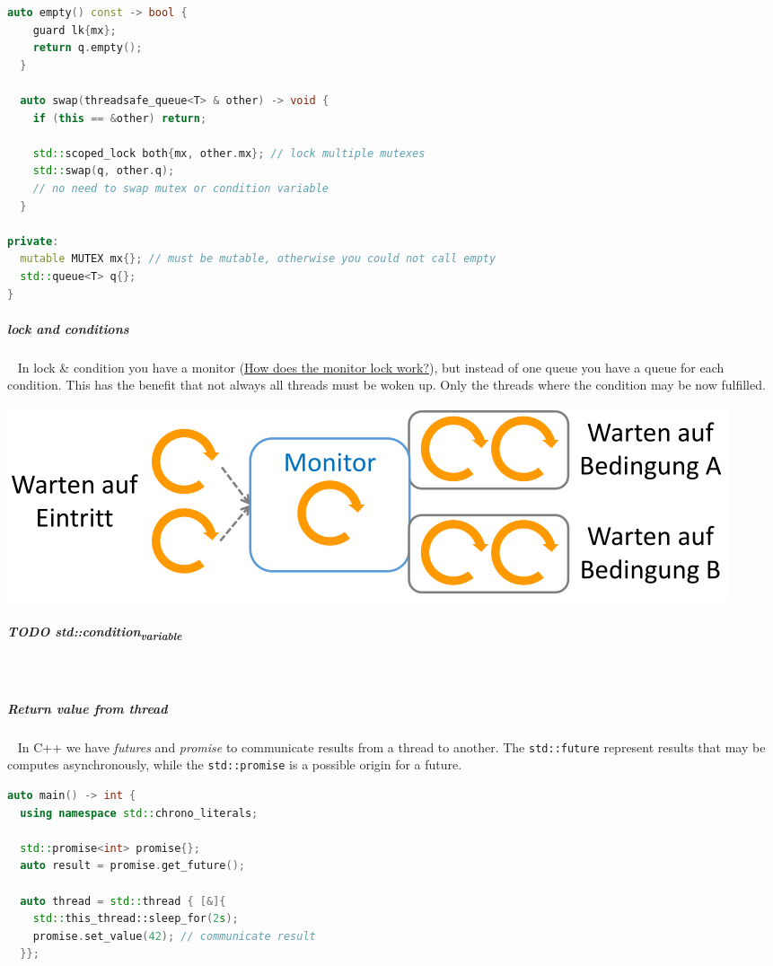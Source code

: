 \documentclass[11pt,twoside,landscape]{article}
\begin{document}
\begin{multicols}{2}
\begin{lstlisting}[language=c++,label=lst:orgc5b3018,caption={Example usage for RAII wrappers},captionpos=b,numbers=none]
  auto empty() const -> bool {
    guard lk{mx};
    return q.empty();
  }

  auto swap(threadsafe_queue<T> & other) -> void {
    if (this == &other) return;

    std::scoped_lock both{mx, other.mx}; // lock multiple mutexes
    std::swap(q, other.q);
    // no need to swap mutex or condition variable
  }

private:
  mutable MUTEX mx{}; // must be mutable, otherwise you could not call empty
  std::queue<T> q{};
}
\end{lstlisting}

\subparagraph{lock and conditions} \
\label{sec:org3480c91}
In lock \& condition you have a monitor (\href{../../../roam/20220315074811-how_does_the_monitor_lock_work.org}{How does the monitor lock work?}), but instead of one queue you have a queue for each condition.
This has the benefit that not always all threads must be woken up.
Only the threads where the condition may be now fulfilled.


{
\begin{center}
\includegraphics[width=.9\linewidth]{img/lock_and_conditions.png}
\end{center}
\label{fig:lock-and-conditions}
}
\subparagraph{{\bfseries\sffamily TODO} std::condition\textsubscript{variable}} \
\label{sec:orge6f1edf}
\subparagraph{Return value from thread} \
\label{sec:orgbab9f5c}
In C++ we have \emph{futures} and \emph{promise} to communicate results from a thread to another.
The \texttt{std::future} represent results that may be computes asynchronously, while the \texttt{std::promise} is a possible origin for a future.

\begin{lstlisting}[language=c++,label=lst:org4c46362,caption={Example usage for future and promise},captionpos=b,numbers=none]
auto main() -> int {
  using namespace std::chrono_literals;

  std::promise<int> promise{};
  auto result = promise.get_future();

  auto thread = std::thread { [&]{
    std::this_thread::sleep_for(2s);
    promise.set_value(42); // communicate result
  }};


\end{lstlisting}
\end{multicols}
\end{document}

